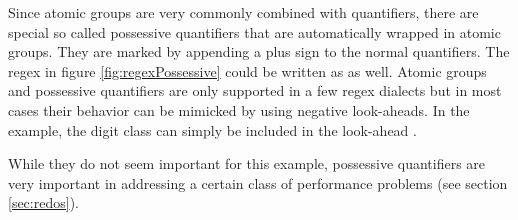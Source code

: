 Since atomic groups are very commonly combined with quantifiers, there are special so called possessive quantifiers that are automatically wrapped in atomic groups. They are marked by appending a plus sign to the normal quantifiers. The regex in figure \ref{fig:regexPossessive} could be written as  as well. Atomic groups and possessive quantifiers are only supported in a few regex dialects but in most cases their behavior can be mimicked by using negative look-aheads. In the example, the digit class can simply be included in the look-ahead .

While they do not seem important for this example, possessive quantifiers are very important in addressing a certain class of performance problems (see section \ref{sec:redos}).




